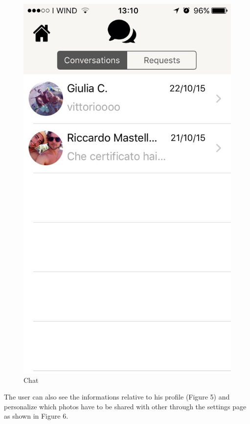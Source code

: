 \begin{multicols}{2}
\begin{figure}[H]
\centering
\includegraphics[scale=0.15]{./images/chat.jpg}
\caption{\label{Augmented reality Experience}Chat}
\end{figure}
\end{multicols}

The user can also see the informations relative to his profile (Figure 5) and personalize which photos have to be shared with other through the settings page as shown in Figure 6.

